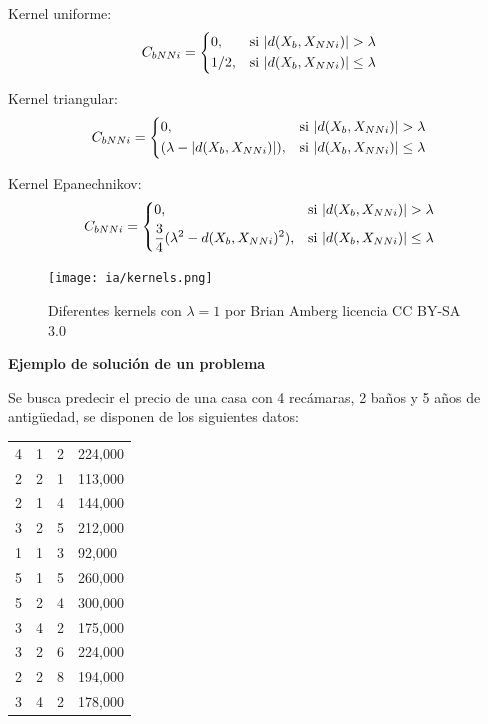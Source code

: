 \documentclass[11pt,fleqn]{book} %
\begin{document}
\begin{itemize}
Kernel uniforme:
\begin{equation}
    C_{bNNi} = 
\begin{dcases}
    0,& \text{si } |d(X_b,X_{NNi})| > \lambda\\
    1/2,& \text{si } |d(X_b,X_{NNi})| \leq  \lambda
\end{dcases} 
\end{equation}

Kernel triangular:
\begin{equation}
    C_{bNNi} = 
\begin{dcases}
    0,& \text{si } |d(X_b,X_{NNi})| > \lambda\\
    (\lambda - |d(X_b,X_{NNi})|) ,& \text{si } |d(X_b,X_{NNi})| \leq  \lambda
\end{dcases} 
\end{equation}

Kernel Epanechnikov:
\begin{equation}
    C_{bNNi} = 
\begin{dcases}
    0,& \text{si } |d(X_b,X_{NNi})| > \lambda\\
    \frac{3}{4}(\lambda^2 - d(X_b,X_{NNi})^2) ,& \text{si } |d(X_b,X_{NNi})| \leq  \lambda
\end{dcases} 
\end{equation}

\begin{figure}[ht]
\centering\texttt{[image: ia/kernels.png]}
\caption{Diferentes kernels con $\lambda= 1$ por Brian Amberg licencia CC BY-SA 3.0}

\label{fig:kernels_knn} 
\end{figure}

\end{itemize}

\textbf{Ejemplo de solución de un problema}

Se busca predecir el precio de una casa con 4 recámaras, 2 baños y 5 años de antigüedad, se disponen de los siguientes datos:

\begin{tabular}{|l|l|l|l|}
\hline
	\thead{recámaras}	& \thead{baños} & \thead{antigüedad} & \thead{precio}\\
\hline
	4 & 1 & 2 & 224,000 \\
\hline
	2 & 2 & 1 & 113,000 \\
\hline
	2 & 1 & 4 & 144,000 \\
\hline
	3 & 2 & 5 & 212,000 \\
\hline
	1 & 1 & 3 & 92,000 \\
\hline
	5 & 1 & 5 & 260,000 \\
\hline
	5 & 2 & 4 & 300,000 \\
\hline
	3 & 4 & 2 & 175,000 \\
\hline
	3 & 2 & 6 & 224,000 \\
\hline
	2 & 2 & 8 & 194,000 \\
\hline
	3 & 4 & 2 & 178,000 \\
\hline
\end{tabular}
\end{document}
